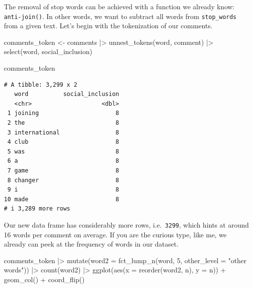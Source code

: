 \documentclass[
  letterpaper,
]{krantz}
\makeatletter
\newenvironment{Shaded}{\begin{snugshade}}{\end{snugshade}}
\newcommand{\AttributeTok}[1]{\textcolor[rgb]{0.40,0.45,0.13}{#1}}
\newcommand{\DecValTok}[1]{\textcolor[rgb]{0.68,0.00,0.00}{#1}}
\newcommand{\FunctionTok}[1]{\textcolor[rgb]{0.28,0.35,0.67}{#1}}
\newcommand{\NormalTok}[1]{\textcolor[rgb]{0.00,0.23,0.31}{#1}}
\newcommand{\OtherTok}[1]{\textcolor[rgb]{0.00,0.23,0.31}{#1}}
\newcommand{\SpecialCharTok}[1]{\textcolor[rgb]{0.37,0.37,0.37}{#1}}
\newcommand{\StringTok}[1]{\textcolor[rgb]{0.13,0.47,0.30}{#1}}
\newenvironment{kframe}{%
\medskip{}
\setlength{\fboxsep}{.8em}
 \def\at@end@of@kframe{}%
 \ifinner\ifhmode%
  \def\at@end@of@kframe{\end{minipage}}%
  \begin{minipage}{\columnwidth}%
 \fi\fi%
 \def\FrameCommand##1{\hskip\@totalleftmargin \hskip-\fboxsep
 \colorbox{shadecolor}{##1}\hskip-\fboxsep
     \hskip-\linewidth \hskip-\@totalleftmargin \hskip\columnwidth}%
 \MakeFramed {\advance\hsize-\width
   \@totalleftmargin\z@ \linewidth\hsize
   \@setminipage}}%
 {\par\unskip\endMakeFramed%
 \at@end@of@kframe}
\renewenvironment{Shaded}{\begin{kframe}}{\end{kframe}}
\makeatother
\begin{document}
The removal of stop words can be achieved with a function we already
know: \texttt{anti-join()}. In other words, we want to subtract all
words from \texttt{stop\_words} from a given text. Let's begin with the
tokenization of our comments.

\begin{Shaded}
\begin{Highlighting}[]
\NormalTok{comments\_token }\OtherTok{\textless{}{-}}
\NormalTok{  comments }\SpecialCharTok{|\textgreater{}}
  \FunctionTok{unnest\_tokens}\NormalTok{(word, comment) }\SpecialCharTok{|\textgreater{}}
  \FunctionTok{select}\NormalTok{(word, social\_inclusion)}

\NormalTok{comments\_token}
\end{Highlighting}
\end{Shaded}

\begin{verbatim}
# A tibble: 3,299 x 2
   word          social_inclusion
   <chr>                    <dbl>
 1 joining                      8
 2 the                          8
 3 international                8
 4 club                         8
 5 was                          8
 6 a                            8
 7 game                         8
 8 changer                      8
 9 i                            8
10 made                         8
# i 3,289 more rows
\end{verbatim}

Our new data frame has considerably more rows, i.e.~\texttt{3299}, which
hints at around 16 words per comment on average. If you are the curious
type, like me, we already can peek at the frequency of words in our
dataset.

\begin{Shaded}
\begin{Highlighting}[]
\NormalTok{comments\_token }\SpecialCharTok{|\textgreater{}}
  \FunctionTok{mutate}\NormalTok{(}\AttributeTok{word2 =} \FunctionTok{fct\_lump\_n}\NormalTok{(word, }\DecValTok{5}\NormalTok{,}
                            \AttributeTok{other\_level =} \StringTok{"other words"}\NormalTok{)) }\SpecialCharTok{|\textgreater{}}
  \FunctionTok{count}\NormalTok{(word2) }\SpecialCharTok{|\textgreater{}}
  \FunctionTok{ggplot}\NormalTok{(}\FunctionTok{aes}\NormalTok{(}\AttributeTok{x =} \FunctionTok{reorder}\NormalTok{(word2, n),}
             \AttributeTok{y =}\NormalTok{ n)) }\SpecialCharTok{+}
  \FunctionTok{geom\_col}\NormalTok{() }\SpecialCharTok{+}
  \FunctionTok{coord\_flip}\NormalTok{()}
\end{Highlighting}
\end{Shaded}
\end{document}
